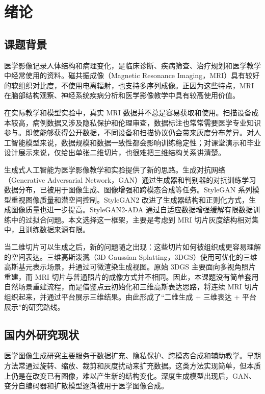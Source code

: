 \chapter{绪论}

\section{课题背景}
医学影像记录人体结构和病理变化，是临床诊断、疾病筛查、治疗规划和医学教学中经常使用的资料。磁共振成像（Magnetic Resonance Imaging，MRI）具有较好的软组织对比度，不使用电离辐射，也支持多序列成像。正因为这些特点，MRI 在脑部结构观察、神经系统疾病分析和医学影像教学中具有较高使用价值。

在实际教学和模型实验中，真实 MRI 数据并不总是容易获取和使用。扫描设备成本较高，病例数据又涉及隐私保护和伦理审查，数据标注也常常需要医学专业知识参与。即使能够获得公开数据，不同设备和扫描协议仍会带来灰度分布差异。对人工智能模型来说，数据规模和数据一致性都会影响训练稳定性；对课堂演示和毕业设计展示来说，仅给出单张二维切片，也很难把三维结构关系讲清楚。

生成式人工智能为医学影像教学和实验提供了新的思路。生成对抗网络（Generative Adversarial Network，GAN）通过生成器和判别器的对抗训练学习数据分布，已被用于图像生成、图像增强和跨模态合成等任务\cite{goodfellow2014gan,skandarani2023gans,khader2023ddpm3d}。StyleGAN 系列模型重视图像质量和潜空间控制。StyleGAN2 改进了生成器结构和正则化方式，生成图像质量也进一步提高\cite{karras2020stylegan2}。StyleGAN2-ADA 通过自适应数据增强缓解有限数据训练中的过拟合问题\cite{karras2020ada}。本文选择这一框架，主要是考虑到 MRI 切片灰度结构相对集中，且训练数据来源有限。

当二维切片可以生成之后，新的问题随之出现：这些切片如何被组织成更容易理解的空间表达。三维高斯泼溅（3D Gaussian Splatting，3DGS）使用可优化的三维高斯基元表示场景，并通过可微渲染生成视图\cite{kerbl20233dgs}。原始 3DGS 主要面向多视角照片重建，而 MRI 切片与普通照片的成像方式并不相同。因此，本课题没有简单套用自然场景重建流程，而是借鉴点云初始化和三维高斯表达思路，将连续 MRI 切片组织起来，并通过平台展示三维结果。由此形成了“二维生成 + 三维表达 + 平台展示”的研究路线。

\section{国内外研究现状}
医学图像生成研究主要服务于数据扩充、隐私保护、跨模态合成和辅助教学。早期方法常通过旋转、缩放、裁剪和灰度扰动来扩充数据。这类方法实现简单，但本质上仍是在改变已有图像，难以产生新的结构变化。深度生成模型出现后，GAN、变分自编码器和扩散模型逐渐被用于医学图像合成。

